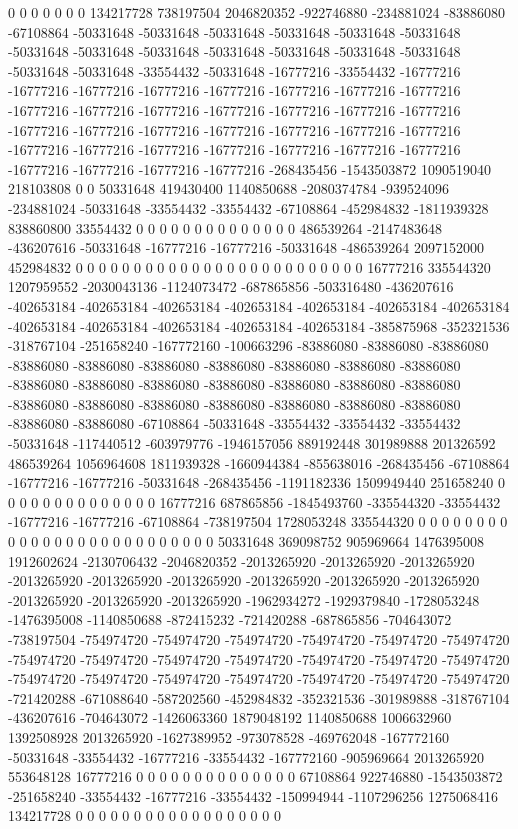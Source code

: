 0 0 0 0 0 0 0 134217728 738197504 2046820352 -922746880 -234881024 -83886080 -67108864 -50331648 -50331648 -50331648 -50331648 -50331648 -50331648 -50331648 -50331648 -50331648 -50331648 -50331648 -50331648 -50331648 -50331648 -50331648 -33554432 -50331648 -16777216 -33554432 -16777216 -16777216 -16777216 -16777216 -16777216 -16777216 -16777216 -16777216 -16777216 -16777216 -16777216 -16777216 -16777216 -16777216 -16777216 -16777216 -16777216 -16777216 -16777216 -16777216 -16777216 -16777216 -16777216 -16777216 -16777216 -16777216 -16777216 -16777216 -16777216 -16777216 -16777216 -16777216 -16777216 -268435456 -1543503872 1090519040 218103808 0 0 50331648 419430400 1140850688 -2080374784 -939524096 -234881024 -50331648 -33554432 -33554432 -67108864 -452984832 -1811939328 838860800 33554432 0 0 0 0 0 0 0 0 0 0 0 0 0 0 486539264 -2147483648 -436207616 -50331648 -16777216 -16777216 -50331648 -486539264 2097152000 452984832 0 0 0 0 0 0 0 0 0 0 0 0 0 0 0 0 0 0
0 0 0 0 0 0 0 16777216 335544320 1207959552 -2030043136 -1124073472 -687865856 -503316480 -436207616 -402653184 -402653184 -402653184 -402653184 -402653184 -402653184 -402653184 -402653184 -402653184 -402653184 -402653184 -402653184 -385875968 -352321536 -318767104 -251658240 -167772160 -100663296 -83886080 -83886080 -83886080 -83886080 -83886080 -83886080 -83886080 -83886080 -83886080 -83886080 -83886080 -83886080 -83886080 -83886080 -83886080 -83886080 -83886080 -83886080 -83886080 -83886080 -83886080 -83886080 -83886080 -83886080 -83886080 -83886080 -67108864 -50331648 -33554432 -33554432 -33554432 -50331648 -117440512 -603979776 -1946157056 889192448 301989888 201326592 486539264 1056964608 1811939328 -1660944384 -855638016 -268435456 -67108864 -16777216 -16777216 -50331648 -268435456 -1191182336 1509949440 251658240 0 0 0 0 0 0 0 0 0 0 0 0 0 0 16777216 687865856 -1845493760 -335544320 -33554432 -16777216 -16777216 -67108864 -738197504 1728053248 335544320 0 0 0 0 0 0 0 0 0 0 0 0 0 0 0 0 0 0
0 0 0 0 0 0 0 0 50331648 369098752 905969664 1476395008 1912602624 -2130706432 -2046820352 -2013265920 -2013265920 -2013265920 -2013265920 -2013265920 -2013265920 -2013265920 -2013265920 -2013265920 -2013265920 -2013265920 -2013265920 -1962934272 -1929379840 -1728053248 -1476395008 -1140850688 -872415232 -721420288 -687865856 -704643072 -738197504 -754974720 -754974720 -754974720 -754974720 -754974720 -754974720 -754974720 -754974720 -754974720 -754974720 -754974720 -754974720 -754974720 -754974720 -754974720 -754974720 -754974720 -754974720 -754974720 -754974720 -721420288 -671088640 -587202560 -452984832 -352321536 -301989888 -318767104 -436207616 -704643072 -1426063360 1879048192 1140850688 1006632960 1392508928 2013265920 -1627389952 -973078528 -469762048 -167772160 -50331648 -33554432 -16777216 -33554432 -167772160 -905969664 2013265920 553648128 16777216 0 0 0 0 0 0 0 0 0 0 0 0 0 0 67108864 922746880 -1543503872 -251658240 -33554432 -16777216 -33554432 -150994944 -1107296256 1275068416 134217728 0 0 0 0 0 0 0 0 0 0 0 0 0 0 0 0 0 0
